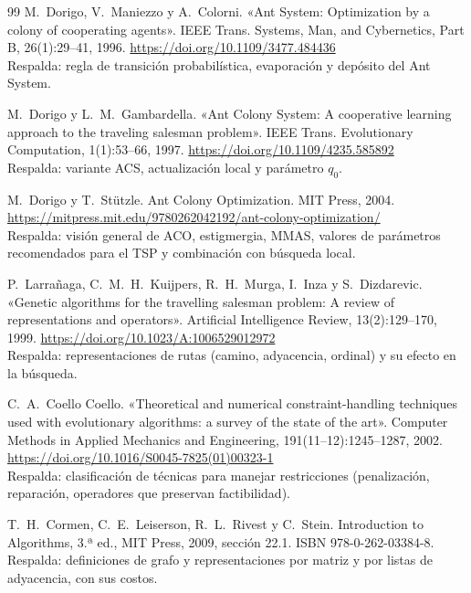 \begin{thebibliography}{99}
M.~Dorigo, V.~Maniezzo y A.~Colorni. «Ant System: Optimization by a colony of
        cooperating agents». IEEE Trans. Systems, Man, and Cybernetics, Part B,
        26(1):29--41, 1996.
        \url{https://doi.org/10.1109/3477.484436}\\
        Respalda: regla de transición probabilística, evaporación y depósito del
        Ant System.

M.~Dorigo y L.~M.~Gambardella. «Ant Colony System: A cooperative learning approach to
        the traveling salesman problem». IEEE Trans. Evolutionary Computation,
        1(1):53--66, 1997.
        \url{https://doi.org/10.1109/4235.585892}\\
        Respalda: variante ACS, actualización local y parámetro $q_0$.

M.~Dorigo y T.~Stützle. Ant Colony Optimization. MIT Press, 2004.
        \url{https://mitpress.mit.edu/9780262042192/ant-colony-optimization/}\\
        Respalda: visión general de ACO, estigmergia, MMAS, valores de parámetros
        recomendados para el TSP y combinación con búsqueda local.

P.~Larrañaga, C.~M.~H.~Kuijpers, R.~H.~Murga, I.~Inza y S.~Dizdarevic. «Genetic
        algorithms for the travelling salesman problem: A review of representations and
        operators». Artificial Intelligence Review, 13(2):129--170, 1999.
        \url{https://doi.org/10.1023/A:1006529012972}\\
        Respalda: representaciones de rutas (camino, adyacencia, ordinal) y su
        efecto en la búsqueda.

C.~A.~Coello Coello. «Theoretical and numerical constraint-handling techniques used
        with evolutionary algorithms: a survey of the state of the art».
        Computer Methods in Applied Mechanics and Engineering, 191(11--12):1245--1287,
        2002. \url{https://doi.org/10.1016/S0045-7825(01)00323-1}\\
        Respalda: clasificación de técnicas para manejar restricciones (penalización,
        reparación, operadores que preservan factibilidad).

T.~H.~Cormen, C.~E.~Leiserson, R.~L.~Rivest y C.~Stein. Introduction to
        Algorithms, 3.ª ed., MIT Press, 2009, sección 22.1.
        ISBN 978-0-262-03384-8.\\
        Respalda: definiciones de grafo y representaciones por matriz y por listas
        de adyacencia, con sus costos.


\end{thebibliography}
